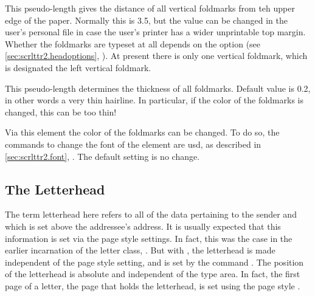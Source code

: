 \begin{Declaration}
\end{Declaration}
%
This pseudo-length gives the
distance of all vertical foldmarks from teh upper edge of the
paper. Normally this is 3.5, but the value can be changed in the
user's personal  file in case the user's printer has a wider
unprintable top margin.  Whether the foldmarks are typeset at all
depends on the option  (see
\autoref{sec:scrlttr2.headoptions},
). At present there is
only one vertical foldmark, which is designated the left vertical
foldmark.
%
%
%


\begin{Declaration}
\end{Declaration}
%
This pseudo-length determines the
thickness of all foldmarks. Default value is 0.2, in other words a
very thin hairline. In particular, if the color of the foldmarks is
changed, this can be too thin!
%


\begin{Declaration}
\end{Declaration}
%
Via this element the color of the
foldmarks can be changed. To do so, the commands to change the font of
the element are usd, as described in \autoref{sec:scrlttr2.font},
. The default setting is no change.
%

\subsection{The Letterhead}
\label{sec:scrlttr2.firstHead}
%

The term letterhead here refers to all of the data pertaining to the
sender and which is set above the addressee's address. It is usually
expected that this information is set via the page style settings. In
fact, this was the case in the earlier incarnation of the letter
class, . But with , the letterhead is
made independent of the page style setting, and is set by the command
.
\iftrue The position of the letterhead is absolute and independent of
the type area. In fact, the first page of a letter, the page that
holds the letterhead, is set using the page style .  \fi

